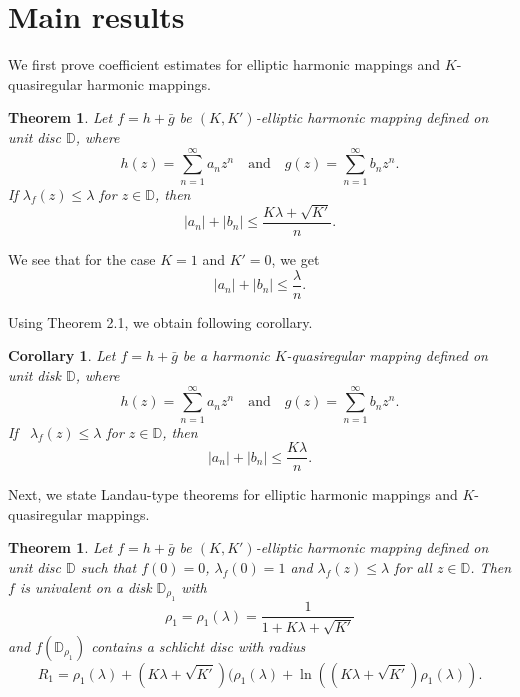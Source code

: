 \documentclass[a4paper,12pt]{amsart}
\theoremstyle{plain}
\newtheorem{thm}[equation]{Theorem}
\newtheorem{cor}[equation]{Corollary}
\theoremstyle{definition}
\begin{document}
\section{Main results}
We first prove coefficient estimates for elliptic harmonic mappings and $K$-quasiregular harmonic mappings.
\begin{thm} \label{Rohi-Vasu-P1-Theorem-001}
 Let $f=h+\bar{g}$ be  $(K, K')$-elliptic harmonic mapping defined on unit disc $\mathbb{D}$, where 
 \begin{equation}\label{Rohi-Vasu-P1-eq-01}
 h(z)=\sum_{n=1}^{\infty} a_n z^n \quad \text{and} \quad g(z)=\sum_{n=1}^{\infty} b_n z^n.
 \end{equation}
If $\lambda_f(z) \leq \lambda$ for $z \in \mathbb{D}$, then
\begin{equation}\label{Rohi-Vasu-P1-eq-02}
\left|a_n\right|+\left|b_n\right| \leq \frac{K \lambda+\sqrt{K'}}{n}.
\end{equation}
\end{thm} 
 We see that for the case $K=1$ and $K'=0$, we get $$\left|a_n\right|+\left|b_n\right| \leq \frac{\lambda}{n}. $$
 
Using Theorem 2.1, we obtain following corollary.
\begin{cor}\label{Rohi-Vasu-P1-Corollary-001}
 Let $f=h+\bar{g}$ be a harmonic  $K$-quasiregular mapping defined on unit disk $\mathbb{D}$, where
$$
h(z) =\sum_{n=1}^{\infty} a_n z^n \quad
\text{and}
\quad g(z) =\sum_{n=1}^{\infty} b_n z^n .
$$
If \  $\lambda_f(z) \leq \lambda$ for $z \in \mathbb{D}$, then
$$
\left|a_n\right|+\left|b_n\right| \leq \frac{K \lambda}{n}.
$$
\end{cor}
Next, we state Landau-type theorems for elliptic harmonic mappings and $K$-quasiregular mappings. 
\begin{thm}\label{Rohi-Vasu-P1-Theorem-002}
  Let $f=h+\bar{g}$ be  $(K, K')$-elliptic harmonic mapping defined on unit disc $\mathbb{D}$ such that $f(0)=0$, $\lambda_f(0)=1$ and $\lambda_f(z) \leq \lambda$ for all $z \in \mathbb{D}$. Then $f$ is univalent on a disk $\mathbb{D}_{\rho_1}$ with
$$
\rho_1=\rho_1(\lambda)=\frac{1}{1+K \lambda+\sqrt{K'}}
$$
and $f\left(\mathbb{D}_{\rho_1}\right)$ contains a schlicht disc with radius
$$
R_1=\rho_1(\lambda)+(K \lambda+\sqrt{K'})(\rho_1(\lambda)+\ln \left(\left(K \lambda+\sqrt{K'}\right) \rho_1(\lambda)\right).
$$

\end{thm}
\end{document}
